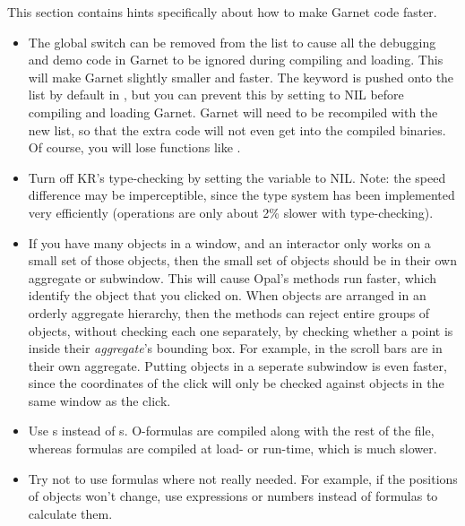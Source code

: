 This section contains hints specifically about how to make Garnet code
faster.

\begin{itemize}
\item The global switch  can be removed from the
 list to cause all the debugging and demo code in Garnet to
be ignored during compiling and loading.  This will make Garnet slightly
smaller and faster.  The  keyword is pushed onto the
 list by default in , but you can
prevent this by setting  to NIL before compiling
and loading Garnet.  Garnet will need to be recompiled with the new
 list, so that the extra code will not even get into the
compiled binaries.  Of course, you will lose functions like
.

\item Turn off KR's type-checking by setting the variable 
to NIL.  Note: the speed difference may be imperceptible, since the type
system has been implemented very efficiently (operations are only about 2\%
slower with type-checking).

\item If you have many objects in a window, and an interactor only works on a
small set of those objects, then the small set of objects should be in
their own aggregate or subwindow.  This will cause Opal's 
methods run faster, which identify the object that you clicked on.  When
objects are arranged in an orderly aggregate hierarchy, then the
 methods can reject entire groups of objects, without checking
each one separately, by checking whether a point is inside their
{\it aggregate}'s bounding box.  For example, in  the scroll bars
are in their own aggregate.  Putting objects in a seperate subwindow is even
faster, since the coordinates of the click will only be checked against objects
in the same window as the click.

\item Use s instead of s.  O-formulas are compiled
along with the rest of the file, whereas formulas are compiled at load-
or run-time, which is much slower.

\item Try not to use formulas where not really needed.  For example, if the
positions of objects won't change, use expressions or numbers instead
of formulas to calculate them.


\end{itemize}
